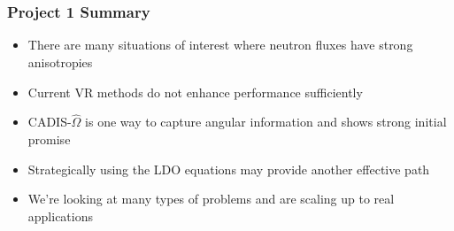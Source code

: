 \documentclass[xcolor=x11names,compress]{beamer}
\renewcommand{\(}{\begin{columns}}
\renewcommand{\)}{\end{columns}}
\newcommand{\<}[1]{\begin{column}{#1}}
\renewcommand{\>}{\end{column}}
\newcommand{\vOmega}{\ensuremath{\hat{\Omega}}}
\begin{document}
\section*{}
\begin{frame}[fragile]
  \frametitle{Project 1 Summary}
  \begin{itemize}
  \item There are many situations of interest where neutron fluxes have strong anisotropies
  \item Current VR methods do not enhance performance sufficiently 
  \pause
  \item CADIS-$\vOmega$ is one way to capture angular information and shows strong initial promise
  \item Strategically using the LDO equations may provide another effective path
  \pause
  \item We're looking at many types of problems and are scaling up to real applications
  \end{itemize}
\end{frame}



\end{document}
